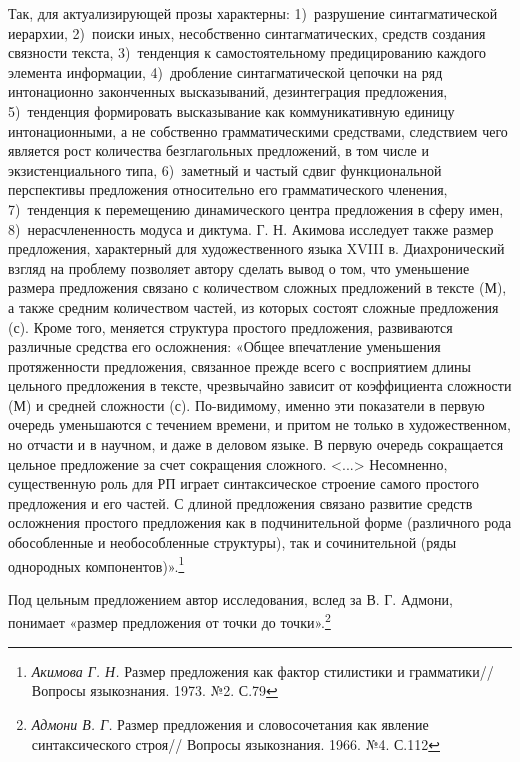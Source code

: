 \documentclass{kursa4}
\begin{document}
{      Так, для актуализирующей прозы характерны: 1)~разрушение синтагматической иерархии, 2)~поиски иных, несобственно синтагматических, средств создания связности текста, 3)~тенденция к самостоятельному предицированию каждого элемента информации, 4)~дробление синтагматической цепочки на ряд интонационно законченных высказываний, дезинтеграция предложения, 5)~тенденция формировать высказывание как коммуникативную единицу интонационными, а не собственно грамматическими средствами, следствием чего является рост количества безглагольных предложений, в том числе и экзистенциального типа, 6)~заметный и частый сдвиг функциональной перспективы предложения относительно его грамматического членения, 7)~тенденция к перемещению динамического центра предложения в сферу имен, 8)~нерасчлененность модуса и диктума. Г. Н. Акимова исследует также размер предложения, характерный для художественного языка XVIII в. Диахронический взгляд на проблему позволяет автору сделать вывод о том, что уменьшение размера предложения связано с количеством сложных предложений в тексте (М), а также средним количеством частей, из которых состоят сложные предложения (с). Кроме того, меняется структура простого предложения, развиваются различные средства его осложнения: «Общее впечатление уменьшения протяженности предложения, связанное прежде всего с восприятием длины цельного предложения в тексте, чрезвычайно зависит от коэффициента сложности (М) и средней сложности (с). По-видимому, именно эти показатели в первую очередь уменьшаются с течением времени, и притом не только в художественном, но отчасти и в научном, и даже в деловом языке. В первую очередь сокращается цельное предложение за счет сокращения сложного. \textless{}...\textgreater{}
      Несомненно, существенную роль для РП играет синтаксическое строение самого простого предложения и его частей. С длиной предложения связано развитие средств осложнения простого предложения как в подчинительной форме (различного рода обособленные и необособленные структуры), так и сочинительной (ряды однородных компонентов)».\footnote{\textit{{ Акимова Г. Н. }}{Размер предложения как фактор стилистики и грамматики// Вопросы языкознания. 1973. №2. С.79}} 

      Под цельным предложением автор исследования, вслед за В. Г. Адмони, понимает «размер предложения от точки до точки».\footnote{\textit{{ Адмони В. Г.}}{ Размер предложения и словосочетания как явление синтаксического строя// Вопросы языкознания. 1966. №4. С.112}}

}
\end{document}
